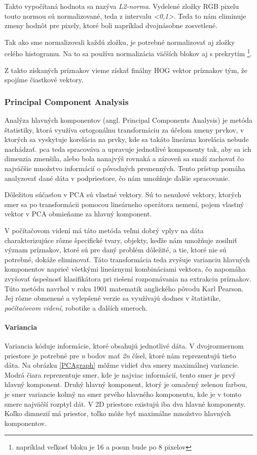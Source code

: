 Takto vypočítaná hodnota sa nazýva \textit{L2-norma}. Vydelené zložky RGB pixelu touto normou sú normalizované, teda z intervalu \textit{<0,1>}. Teda to nám eliminuje zmeny hodnôt pre pixely, ktoré boli napríklad dvojnásobne zosvetlené. 

Tak ako sme normalizovali každú zložku, je potrebné normalizovať aj zložky celého histogramu. Na to sa používa normalizácia väčších blokov aj s prekrytím \footnote{napríklad veľkosť bloku je 16 a posun bude po 8 pixelov}. 

Z takto získaných príznakov vieme získať finálny HOG vektor príznakov tým, že spojíme čiastkové vektory.
\cite{c11}\cite{c20}


\subsubsection{Principal Component Analysis} \label{PCAlabel}
Analýza hlavných komponentov (angl. Principal Components Analysis) je metóda štatistiky, ktorá využíva ortogonálnu transformáciu za účelom zmeny prvkov, v ktorých sa vyskytuje korelácia na prvky, kde  sa takáto lineárna korelácia nebude nachádzať. \acrshort{pca} teda spracováva a upravuje jednotlivé komponenty tak, aby sa ich dimenzia zmenšila, alebo bola nanajvýš rovnaká a zároveň sa snaží zachovať čo najväčšie množstvo informácií o pôvodných premenných. Tento prístup pomáha analyzovať dané dáta v podpriestore, čo nám umožňuje ďalšie spracovanie.

Dôležitou súčasťou v PCA sú vlastné vektory. Sú to nenulové vektory, ktorých smer sa po transformácii pomocou lineárneho operátora nemení, pojem vlastný vektor v PCA obmieňame za hlavný komponent. 

V počítačovom videní má táto metóda veľmi dobrý vplyv na dáta charakterizujúce rôzne špecifické tvary, objekty, keďže nám umožňuje zosilniť význam príznakov, ktoré sú pre daný problém dôležité, a tie, ktoré nie sú potrebné, dokáže eliminovať. Táto transformácia teda zvyšuje varianciu hlavných komponentov naprieč všetkými lineárnymi kombináciami vektora, čo napomáha zvyšovať úspešnosť klasifikátora pri riešení rozpoznávania na extrakciu príznakov. Túto metódu navrhol v roku 1901 matematik anglického pôvodu Karl Pearson. Jej rôzne obmenené a vylepšené verzie sa využívajú dodnes v štatistike, \textit{počítačovom videní}, robotike a ďalších smeroch.


\paragraph{Variancia}
Variancia kóduje informácie, ktoré obsahujú jednotlivé dáta. V dvojrozmernom priestore je potrebné pre \textit{n} bodov mať \textit{2n} čísel, ktoré nám reprezentujú tieto dáta. Na obrázku \ref{PCAgraph} môžme vidieť dva smery maximálnej variancie. Modrá čiara reprezentuje smer, kde je najviac informácií, tento smer je prvý hlavný komponent. Druhý hlavný komponent, ktorý je označený zelenou farbou, je smer variancie kolmý na smer prvého hlavného komponentu, kde je v tomto smere najväčší rozptyl dát. V 2D priestore existujú iba dva hlavné komponenty. Koľko dimnezií má priestor, toľko môže byť maximálne množstvo hlavných komponentov.  

